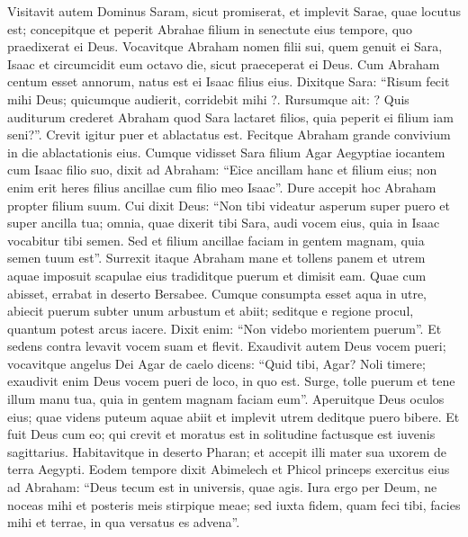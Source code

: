 \begin{biblechapter}
\begin{biblechapter}
\begin{biblechapter}
\begin{biblechapter}
\begin{biblechapter}
\begin{biblechapter}
\begin{biblechapter}
\begin{biblechapter}
\begin{biblechapter}
\begin{biblechapter}
\begin{biblechapter}
\begin{biblechapter}
\begin{biblechapter}
\begin{biblechapter}
\begin{biblechapter}
\begin{biblechapter}
\begin{biblechapter}
\begin{biblechapter}
\begin{biblechapter}
\begin{biblechapter}
\begin{biblechapter}
\verse Visitavit autem Dominus Saram, sicut promiserat, et implevit Sarae, quae locutus est; 
\verse concepitque et peperit Abrahae filium in senectute eius tempore, quo praedixerat ei Deus. 
\verse Vocavitque Abraham nomen filii sui, quem genuit ei Sara, Isaac 
\verse et circumcidit eum octavo die, sicut praeceperat ei Deus. 
\verse Cum Abraham centum esset annorum, natus est ei Isaac filius eius. 
 \verse Dixitque Sara:
 “Risum fecit mihi Deus;
 quicumque audierit, corridebit mihi ?.
 \verse Rursumque ait:
 ? Quis auditurum crederet Abraham
 quod Sara lactaret filios,
 quia peperit ei filium
 iam seni?”.
 \verse Crevit igitur puer et ablactatus est. Fecitque Abraham grande convivium in die ablactationis eius. 
\verse Cumque vidisset Sara filium Agar Aegyptiae iocantem cum Isaac filio suo, dixit ad Abraham: 
\verse “Eice ancillam hanc et filium eius; non enim erit heres filius ancillae cum filio meo Isaac”. 
\verse Dure accepit hoc Abraham propter filium suum. 
\verse Cui dixit Deus: “Non tibi videatur asperum super puero et super ancilla tua; omnia, quae dixerit tibi Sara, audi vocem eius, quia in Isaac vocabitur tibi semen. 
\verse Sed et filium ancillae faciam in gentem magnam, quia semen tuum est”.
 \verse Surrexit itaque Abraham mane et tollens panem et utrem aquae imposuit scapulae eius tradiditque puerum et dimisit eam. Quae cum abisset, errabat in deserto Bersabee. 
\verse Cumque consumpta esset aqua in utre, abiecit puerum subter unum arbustum 
\verse et abiit; seditque e regione procul, quantum potest arcus iacere. Dixit enim: “Non videbo morientem puerum”. Et sedens contra levavit vocem suam et flevit. 
\verse Exaudivit autem Deus vocem pueri; vocavitque angelus Dei Agar de caelo dicens: “Quid tibi, Agar? Noli timere; exaudivit enim Deus vocem pueri de loco, in quo est. 
\verse Surge, tolle puerum et tene illum manu tua, quia in gentem magnam faciam eum”. 
\verse Aperuitque Deus oculos eius; quae videns puteum aquae abiit et implevit utrem deditque puero bibere. 
\verse Et fuit Deus cum eo; qui crevit et moratus est in solitudine factusque est iuvenis sagittarius. 
\verse Habitavitque in deserto Pharan; et accepit illi mater sua uxorem de terra Aegypti.
 \verse Eodem tempore dixit Abimelech et Phicol princeps exercitus eius ad Abraham: “Deus tecum est in universis, quae agis. 
\verse Iura ergo per Deum, ne noceas mihi et posteris meis stirpique meae; sed iuxta fidem, quam feci tibi, facies mihi et terrae, in qua versatus es advena”. 

\end{biblechapter}
\end{biblechapter}
\end{biblechapter}
\end{biblechapter}
\end{biblechapter}
\end{biblechapter}
\end{biblechapter}
\end{biblechapter}
\end{biblechapter}
\end{biblechapter}
\end{biblechapter}
\end{biblechapter}
\end{biblechapter}
\end{biblechapter}
\end{biblechapter}
\end{biblechapter}
\end{biblechapter}
\end{biblechapter}
\end{biblechapter}
\end{biblechapter}
\end{biblechapter}
